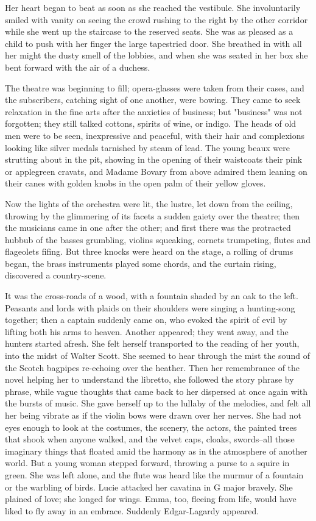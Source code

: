 \documentclass{tufte-book}
\begin{document}
Her heart began to beat as soon as she reached the vestibule. She
involuntarily smiled with vanity on seeing the crowd rushing to the
right by the other corridor while she went up the staircase to the
reserved seats. She was as pleased as a child to push with her finger
the large tapestried door. She breathed in with all her might the
dusty smell of the lobbies, and when she was seated in her box she bent
forward with the air of a duchess.

The theatre was beginning to fill; opera-glasses were taken from their
cases, and the subscribers, catching sight of one another, were bowing.
They came to seek relaxation in the fine arts after the anxieties of
business; but "business" was not forgotten; they still talked cottons,
spirits of wine, or indigo. The heads of old men were to be seen,
inexpressive and peaceful, with their hair and complexions looking like
silver medals tarnished by steam of lead. The young beaux were strutting
about in the pit, showing in the opening of their waistcoats their pink
or applegreen cravats, and Madame Bovary from above admired them leaning
on their canes with golden knobs in the open palm of their yellow
gloves.

Now the lights of the orchestra were lit, the lustre, let down from the
ceiling, throwing by the glimmering of its facets a sudden gaiety over
the theatre; then the musicians came in one after the other; and
first there was the protracted hubbub of the basses grumbling, violins
squeaking, cornets trumpeting, flutes and flageolets fifing. But three
knocks were heard on the stage, a rolling of drums began, the brass
instruments played some chords, and the curtain rising, discovered a
country-scene.

It was the cross-roads of a wood, with a fountain shaded by an oak to
the left. Peasants and lords with plaids on their shoulders were singing
a hunting-song together; then a captain suddenly came on, who evoked
the spirit of evil by lifting both his arms to heaven. Another appeared;
they went away, and the hunters started afresh. She felt herself
transported to the reading of her youth, into the midst of Walter Scott.
She seemed to hear through the mist the sound of the Scotch bagpipes
re-echoing over the heather. Then her remembrance of the novel helping
her to understand the libretto, she followed the story phrase by phrase,
while vague thoughts that came back to her dispersed at once again with
the bursts of music. She gave herself up to the lullaby of the melodies,
and felt all her being vibrate as if the violin bows were drawn over her
nerves. She had not eyes enough to look at the costumes, the scenery,
the actors, the painted trees that shook when anyone walked, and the
velvet caps, cloaks, swords--all those imaginary things that floated
amid the harmony as in the atmosphere of another world. But a young
woman stepped forward, throwing a purse to a squire in green. She was
left alone, and the flute was heard like the murmur of a fountain or the
warbling of birds. Lucie attacked her cavatina in G major bravely. She
plained of love; she longed for wings. Emma, too, fleeing from life,
would have liked to fly away in an embrace. Suddenly Edgar-Lagardy
appeared.
\end{document}
